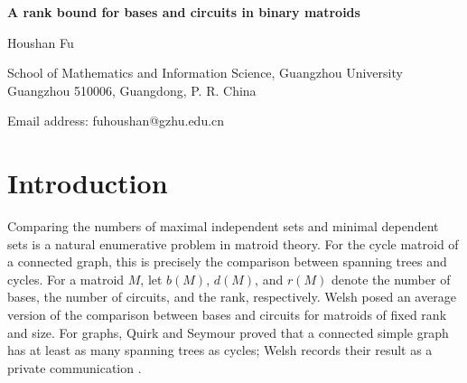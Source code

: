 \documentclass[11pt]{article}
\numberwithin{equation}{section}
\begin{document}
\begin{center}
{\Large\bfseries A rank bound for bases and circuits in binary matroids}
\end{center}
\begin{center}
Houshan Fu\par

School of Mathematics and Information Science, Guangzhou University\\
Guangzhou 510006, Guangdong, P. R. China\par

Email address: fuhoushan@gzhu.edu.cn
\end{center}
\begin{abstract}
Let \(b(M)\), \(d(M)\), and \(r(M)\) denote the number of bases,
the number of circuits, and the rank of a matroid \(M\), respectively.
We prove that every nonempty simple binary matroid with no coloops satisfies
\[
 2b(M)\ge(r(M)+1)d(M),
\]
with equality if and only if \(M\) is isomorphic to the Fano matroid.
This confirms a conjecture recorded by Oxley in 1983.
For the same class, we prove that deleting any element leaves at least
as many bases as there are circuits in the original matroid:
\(b(M\backslash e)\ge d(M)\) for every \(e\in E(M)\).
We determine all equality cases and deduce a sharp linear lower bound
for basis growth under successive series extensions.
The main counting step is a joint estimate for the three largest possible
circuit sizes, obtained from contraction-normalized fundamental-circuit
counts and an exact folded-cube edge correspondence.
\par\smallskip
\noindent\textbf{Keywords:} Binary matroid; bases; circuits; enumeration
\par\smallskip
\noindent\textbf{Mathematics Subject Classification:} 05B35
\end{abstract}

\section{Introduction}

Comparing the numbers of maximal independent sets and minimal dependent
sets is a natural enumerative problem in matroid theory. For the cycle
matroid of a connected graph, this is precisely the comparison between
spanning trees and cycles.
For a matroid \(M\), let \(b(M)\), \(d(M)\), and \(r(M)\) denote
the number of bases, the number of circuits, and the rank, respectively.
Welsh \cite[p.~288, Exercise~5]{Welsh1976} posed an average version
of the comparison between bases and circuits for matroids of fixed
rank and size. For graphs, Quirk and Seymour proved that a connected
simple graph has at least as many spanning trees as cycles; Welsh
records their result as a private communication \cite[p.~287]{Welsh1976}.
\end{document}
